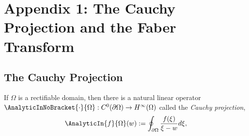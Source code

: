 \documentclass{article}
\numberwithin{equation}{section}
\begin{document}

\newpage
\printbibliography



\newpage
\section{Appendix 1: The Cauchy Projection and the Faber Transform}\label{subsec:CauchyTransformFaberTransform}

\subsection{The Cauchy Projection}\label{subsec:CauchyTransformV2}
If $\Omega$ is a rectifiable domain, then there is a natural linear operator $\AnalyticInNoBracket{\cdot}{\Omega}:C^0(\partial\Omega)\rightarrow H^{\infty}(\Omega)$ called the {\it Cauchy projection},
\begin{equation}\label{eqn:analyticprojection}
\AnalyticIn{f}{\Omega}(w):=\oint_{\partial\Omega}\dfrac{f(\xi)}{\xi-w}d\xi,
\end{equation}
\end{document}
